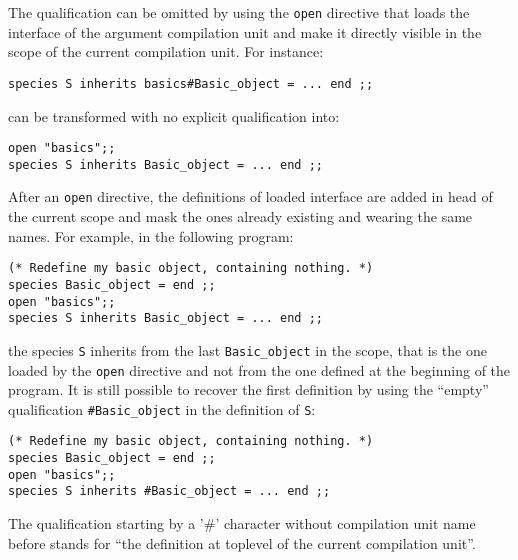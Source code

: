 The qualification can be omitted by using the {\tt open} directive
that loads the interface of the argument compilation unit and make it
directly visible in the scope of the current compilation unit. For
instance:

{\scriptsize
\begin{lstlisting}
species S inherits basics#Basic_object = ... end ;;
\end{lstlisting}
}
can be transformed with no explicit qualification into:
{\scriptsize
\begin{lstlisting}
open "basics";;
species S inherits Basic_object = ... end ;;
\end{lstlisting}
}

After an {\tt open} directive, the definitions of loaded interface are
added in head of the current scope and mask the ones already existing
and wearing the same names. For example, in the following program:
{\scriptsize
\begin{lstlisting}
(* Redefine my basic object, containing nothing. *)
species Basic_object = end ;;
open "basics";;
species S inherits Basic_object = ... end ;;
\end{lstlisting}
}
the species {\tt S} inherits from the last {\tt Basic\_object} in the
scope, that is the one loaded by the {\tt open} directive and not from
the one defined at the beginning of the program. It is still possible
to recover the first definition by using the ``empty'' qualification
{\tt \#Basic\_object} in the definition of {\tt S}:
{\scriptsize
\begin{lstlisting}
(* Redefine my basic object, containing nothing. *)
species Basic_object = end ;;
open "basics";;
species S inherits #Basic_object = ... end ;;
\end{lstlisting}
}

The qualification starting by a '\#' character without compilation
unit name before stands for ``the definition at toplevel of the
current compilation unit''.



